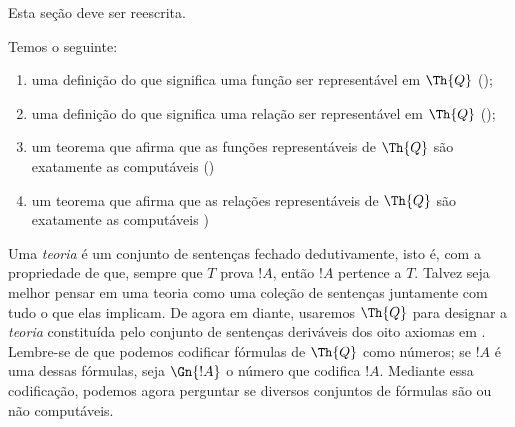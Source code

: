 \documentclass[../../../include/open-logic-section]{subfiles}
\begin{document}


\begin{editorial}
Esta seção deve ser reescrita.
\end{editorial}

Temos o seguinte:
\begin{enumerate}
\item uma definição do que significa uma função ser representável em
  $\Th{Q}$ ();
\item uma definição do que significa uma relação ser representável em
  $\Th{Q}$ ();
\item um teorema que afirma que as funções representáveis de $\Th{Q}$
  são exatamente as computáveis
  ()
\item um teorema que afirma que as relações representáveis de $\Th{Q}$
  são exatamente as computáveis
  )
\end{enumerate}

Uma {\em teoria} é um conjunto de sentenças fechado dedutivamente,
isto é, com a propriedade de que, sempre que $T$ prova $!A$, então
$!A$ pertence a $T$. Talvez seja melhor pensar em uma teoria como uma
coleção de sentenças juntamente com tudo o que elas implicam. De agora
em diante, usaremos $\Th{Q}$ para designar a {\em teoria} constituída
pelo conjunto de sentenças deriváveis dos oito axiomas em
. Lembre-se de que podemos codificar fórmulas de
$\Th{Q}$ como números; se $!A$ é uma dessas fórmulas, seja $\Gn{!A}$ o
número que codifica $!A$. Mediante essa codificação, podemos agora
perguntar se diversos conjuntos de fórmulas são ou não computáveis.
\end{document}
